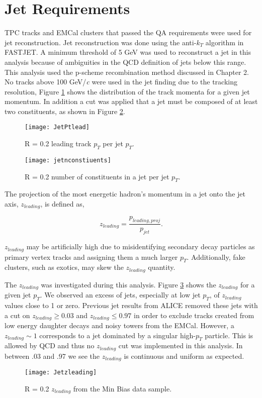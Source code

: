 \section{Jet Requirements}

TPC tracks and EMCal clusters that passed the QA requirements were used for jet reconstruction. Jet reconstruction was done using the anti-$k_{T}$ algorithm in FASTJET.  A minimum threshold of 5 GeV was used to reconstruct a jet in this analysis because of ambiguities in the QCD definition of jets below this range.  This analysis used the p-scheme recombination method discussed in Chapter 2. No tracks above 100 GeV/\textit{c} were used in the jet finding due to the tracking resolution, Figure \ref{fig:JetPt} shows the distribution of the track momenta for a given jet momentum.  In addition a cut was applied that a jet must be composed of at least two constituents, as shown in Figure \ref{fig:JetConst}.


\begin{figure}[b!]
\texttt{[image: JetPtlead]}
\centering
\caption{R = 0.2 leading track $p_{T}$ per jet $p_{T}$.}
\label{fig:JetPt}
\end{figure}

\begin{figure}
\texttt{[image: jetnconstiuents]}
\centering
\caption{R = 0.2 number of constituents in a jet per jet $p_{T}$.}
\label{fig:JetConst}
\end{figure}


The projection of the most energetic hadron's momentum in a jet onto the jet axis, $z_{leading}$, is defined as,

\begin{equation}
z_{leading} = \frac{ p_{leading, proj} }{ p_{jet} }.
\label{eq:zleading}
\end{equation}

\noindent
$z_{leading}$ may be artificially high due to misidentifying secondary decay particles as primary vertex tracks and assigning them a much larger $p_{T}$.  Additionally, fake clusters, such as exotics, may skew the $z_{leading}$ quantity.  

The $z_{leading}$ was investigated during this analysis. Figure \ref{fig:Jetz} shows the $z_{leading}$ for a given jet $p_{T}$.  We observed an excess of jets, especially at low jet $p_{T}$, of $z_{leading}$ values close to 1 or zero.  Previous jet results from ALICE removed these jets with a cut on $ z_{leading} \geq 0.03$ and $z_{leading} \leq 0.97$ in order to exclude tracks created from low energy daughter decays and noisy towers from the EMCal.  However, a $z_{leading} \sim 1$ corresponds to a jet dominated by a singular high-$p_{T}$ particle.  This is allowed by QCD and thus no $z_{leading}$ cut was implemented in this analysis.  In between .03 and .97 we see the $z_{leading}$ is continuous and uniform as expected.  
\begin{figure}[t!]
\texttt{[image: Jetzleading]}
\centering
\caption{R = 0.2 $z_{leading}$ from the Min Bias data sample.}
\label{fig:Jetz}
\end{figure}

